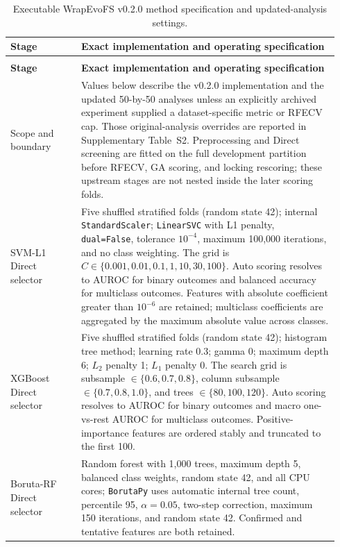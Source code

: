 {
\footnotesize
\renewcommand{\arraystretch}{1.11}
\setlength{\tabcolsep}{3.5pt}
\begin{longtable}{@{}>{\raggedright\arraybackslash}p{0.205\linewidth}>{\raggedright\arraybackslash}p{0.735\linewidth}@{}}
\caption{Executable WrapEvoFS v0.2.0 method specification and updated-analysis settings.}\label{tab:supp23}\\
\toprule
\bfseries Stage & \bfseries Exact implementation and operating specification \\
\midrule
\endfirsthead
\multicolumn{2}{l}{\footnotesize\itshape \tablename~\thetable\ (continued)}\\
\toprule
\bfseries Stage & \bfseries Exact implementation and operating specification \\
\midrule
\endhead
\bottomrule
\endfoot
Scope and boundary & Values below describe the v0.2.0 implementation and the updated 50-by-50 analyses unless an explicitly archived experiment supplied a dataset-specific metric or RFECV cap. Those original-analysis overrides are reported in Supplementary Table~S2. Preprocessing and Direct screening are fitted on the full development partition before RFECV, GA scoring, and locking rescoring; these upstream stages are not nested inside the later scoring folds. \\
SVM-L1 Direct selector & Five shuffled stratified folds (random state 42); internal \texttt{StandardScaler}; \texttt{LinearSVC} with L1 penalty, \texttt{dual=False}, tolerance $10^{-4}$, maximum 100,000 iterations, and no class weighting. The grid is $C\in\{0.001,0.01,0.1,1,10,30,100\}$. Auto scoring resolves to AUROC for binary outcomes and balanced accuracy for multiclass outcomes. Features with absolute coefficient greater than $10^{-6}$ are retained; multiclass coefficients are aggregated by the maximum absolute value across classes. \\
XGBoost Direct selector & Five shuffled stratified folds (random state 42); histogram tree method; learning rate 0.3; gamma 0; maximum depth 6; $L_2$ penalty 1; $L_1$ penalty 0. The search grid is subsample $\in\{0.6,0.7,0.8\}$, column subsample $\in\{0.7,0.8,1.0\}$, and trees $\in\{80,100,120\}$. Auto scoring resolves to AUROC for binary outcomes and macro one-vs-rest AUROC for multiclass outcomes. Positive-importance features are ordered stably and truncated to the first 100. \\
Boruta-RF Direct selector & Random forest with 1,000 trees, maximum depth 5, balanced class weights, random state 42, and all CPU cores; \texttt{BorutaPy} uses automatic internal tree count, percentile 95, $\alpha=0.05$, two-step correction, maximum 150 iterations, and random state 42. Confirmed and tentative features are both retained. \\

\end{longtable}}
